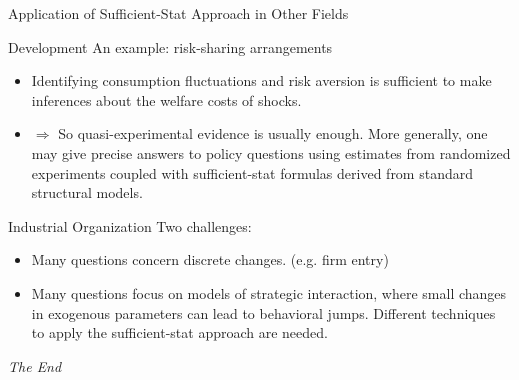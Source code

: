 \documentclass{beamer}
\begin{document}
\begin{frame}{Application of Sufficient-Stat Approach in Other Fields}
	\begin{block}{Development}
		An example: risk-sharing arrangements
		\begin{itemize}
			\item Identifying consumption fluctuations and risk aversion is sufficient to make inferences about the welfare costs of shocks.
			\item $\Rightarrow$ So quasi-experimental evidence is usually enough. More generally, one may give precise answers to policy questions using estimates from randomized experiments coupled with sufficient-stat formulas derived from standard structural models.
		\end{itemize}
	\end{block}
	\begin{block}{Industrial Organization}
		Two challenges:
		\begin{itemize}
			\item Many questions concern discrete changes. (e.g. firm entry)
			\item Many questions focus on models of strategic interaction, where small changes in exogenous parameters can lead to behavioral jumps. Different techniques to apply the sufficient-stat approach are needed.
		\end{itemize}
	\end{block}
\end{frame}


\begin{frame}
\Huge{\centerline{\textit{The End}}}
\end{frame}
\end{document}
